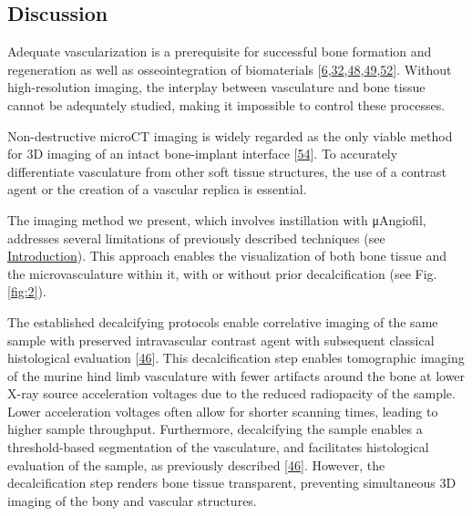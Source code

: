 \hypertarget{discussion}{%
\subsection{Discussion}\label{discussion}}

Adequate vascularization is a prerequisite for successful bone formation and regeneration as well as osseointegration of biomaterials {[}\protect\hyperlink{ref-16mB4VUpP}{6},\protect\hyperlink{ref-lVl4gVyN}{32},\protect\hyperlink{ref-Ha1wHU4s}{48},\protect\hyperlink{ref-zB5E7Obz}{49},\protect\hyperlink{ref-zXoIXG3G}{52}{]}.
Without high-resolution imaging, the interplay between vasculature and bone tissue cannot be adequately studied, making it impossible to control these processes.

Non-destructive microCT imaging is widely regarded as the only viable method for 3D imaging of an intact bone-implant interface {[}\protect\hyperlink{ref-11349lK8v}{54}{]}.
To accurately differentiate vasculature from other soft tissue structures, the use of a contrast agent or the creation of a vascular replica is essential.

The imaging method we present, which involves instillation with μAngiofil, addresses several limitations of previously described techniques (see \protect\hyperlink{introduction}{Introduction}).
This approach enables the visualization of both bone tissue and the microvasculature within it, with or without prior decalcification (see Fig. \ref{fig:2}).

The established decalcifying protocols enable correlative imaging of the same sample with preserved intravascular contrast agent with subsequent classical histological evaluation {[}\protect\hyperlink{ref-iM9i6gkJ}{46}{]}.
This decalcification step enables tomographic imaging of the murine hind limb vasculature with fewer artifacts around the bone at lower X-ray source acceleration voltages due to the reduced radiopacity of the sample.
Lower acceleration voltages often allow for shorter scanning times, leading to higher sample throughput.
Furthermore, decalcifying the sample enables a threshold-based segmentation of the vasculature, and facilitates histological evaluation of the sample, as previously described {[}\protect\hyperlink{ref-iM9i6gkJ}{46}{]}.
However, the decalcification step renders bone tissue transparent, preventing simultaneous 3D imaging of the bony and vascular structures.

